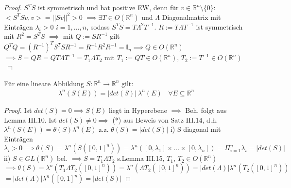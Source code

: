     \begin{proof}
	$S^T S$ ist symmetrisch und hat positive EW, denn für \newline $v\in\mathbb{R}^n\setminus\{0\}:$ $<S^T Sv,v > = ||Sv||^2 > 0$ \newline
	$\implies \exists T\in O(\mathbb{R}^n)$ und $\Lambda$ Diagonalmatrix mit Einträgen $\lambda_i > 0$ $i=1,...,n$, sodass $S^T S = T \Lambda^2 T^{-1}$. \newline
	$R := T \Lambda T^{-1}$ ist symmetrisch mit $R^2 = S^T S$ $\implies$ mit $Q := S R^{-1}$ gilt \newline
	$Q^T Q = (R^{-1})^T S^T S R^{-1} = R^{-1} R^2 R^{-1} = \mathbb{I}_n \implies Q \in O(\mathbb{R}^n)$ \newline
	$\implies S = Q R = Q T \Lambda T^{-1} = T_1 \Lambda T_2$ mit $T_1 := Q T \in O(\mathbb{R}^n)$, $T_2 := T^{-1} \in O(\mathbb{R}^n)$
	\end{proof}

  \begin{theorem}
    Für eine lineare Abbildung $S: \mathbb{R}^n \to \mathbb{R}^n$ gilt:
    \begin{align*}
      \lambda^n(S(E)) = |det(S)| \ \lambda^n(E) \ \ \ \ \forall E \subseteq \mathbb{R}^n
    \end{align*}
  \end{theorem}

    \begin{proof}
	Ist $det(S) = 0 \implies S(E)$ liegt in Hyperebene $\implies$ Beh. folgt aus Lemma III.10. \newline
	Ist $det(S) \neq 0 \implies$ (*) aus Beweis von Satz III.14, d.h. $\lambda^n(S(E)) = \theta(S) \lambda^n(E)$ \newline
	z.z. $\theta(S) = |det(S)|$ \newline
	i) S diagonal mit Einträgen $\lambda_i > 0 \implies \theta(S) = \lambda^n(S([0,1]^n)) = \lambda^n([0,\lambda_1]\times ... \times [0,\lambda_n])= \Pi_{i=1}^{n} \lambda_i = |det(S)|$ \newline 
	ii) $S\in GL(\mathbb{R}^n)$ bel. $\implies S = T_1 \Lambda T_2$ s.Lemma III.15, $T_1$, $T_2 \in O(\mathbb{R}^n)$ \newline
	$\implies \theta(S) = \lambda^n(T_1\Lambda T_2([0,1]^n)) = \lambda^n(\Lambda T_2([0,1]^n)) = |det(\Lambda)| \lambda^n(T_2([0,1]^n))$ \newline $= |det(\Lambda)| \lambda^n([0,1]^n) = |det(S)|$
	\end{proof}

